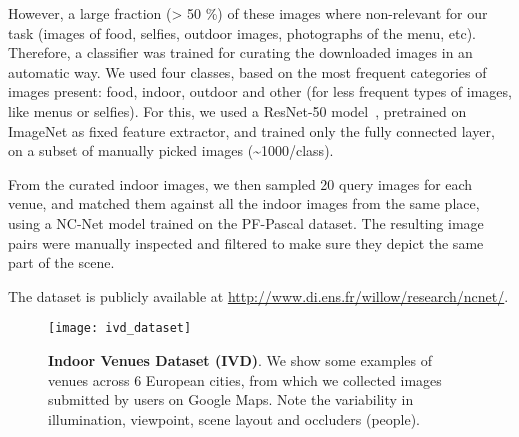 \documentclass{article}
\begin{document}
However, a large fraction (> 50 \%)
of these images where non-relevant for our task (images of food, selfies, outdoor images, photographs of the menu, etc). Therefore, a classifier was trained for curating the downloaded images in an automatic way. We used four classes, based on the most frequent categories of images present: food, indoor, outdoor and other (for less frequent types of images, like menus or selfies). For this, we used a ResNet-50 model~\cite{he2016deep}, pretrained on ImageNet as fixed feature extractor, and trained only the fully connected layer, on a subset of manually picked images (\textasciitilde{}1000/class).

From the curated indoor images, we then sampled 20 query images for each venue, and matched them against all the indoor images from the same place, using a NC-Net model trained on the PF-Pascal dataset. The resulting image pairs were manually inspected and filtered to make sure they depict the same part of the scene.

The dataset is publicly available at \url{http://www.di.ens.fr/willow/research/ncnet/}.

\begin{figure}[tbp]
  \centering
  \texttt{[image: ivd\_dataset]}
\caption{{\bf Indoor Venues Dataset (IVD)}. We show some examples of venues across 6 European cities, from which we collected images submitted by users on Google Maps. Note the variability in illumination, viewpoint, scene layout and occluders (people).}
  \label{fig:ivd-dataset}
\end{figure}
\end{document}
